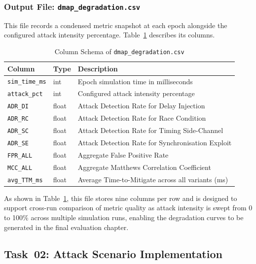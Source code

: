 \subsubsection{Output File: \texttt{dmap\_degradation.csv}}

This file records a condensed metric snapshot at each
epoch alongside the configured attack intensity
percentage. Table~\ref{tab:degradation_schema}
describes its columns.

\begin{table}[htb]
\centering
\caption{Column Schema of \texttt{dmap\_degradation.csv}}
\label{tab:degradation_schema}
\setlength{\tabcolsep}{4pt}
\begin{tabular}{lll}
\hline
\textbf{Column} & \textbf{Type} & \textbf{Description} \\
\hline
\texttt{sim\_time\_ms} & int   &
  Epoch simulation time in milliseconds \\
\texttt{attack\_pct}   & int   &
  Configured attack intensity percentage \\
\texttt{ADR\_DI}       & float &
  Attack Detection Rate for Delay Injection \\
\texttt{ADR\_RC}       & float &
  Attack Detection Rate for Race Condition \\
\texttt{ADR\_SC}       & float &
  Attack Detection Rate for Timing Side-Channel \\
\texttt{ADR\_SE}       & float &
  Attack Detection Rate for Synchronisation Exploit \\
\texttt{FPR\_ALL}      & float &
  Aggregate False Positive Rate \\
\texttt{MCC\_ALL}      & float &
  Aggregate Matthews Correlation Coefficient \\
\texttt{avg\_TTM\_ms}  & float &
  Average Time-to-Mitigate across all variants (ms) \\
\hline
\end{tabular}
\end{table}

As shown in Table~\ref{tab:degradation_schema}, this
file stores nine columns per row and is designed to
support cross-run comparison of metric quality as
attack intensity is swept from 0 to 100\% across
multiple simulation runs, enabling the degradation
curves to be generated in the final evaluation chapter.

\subsection{Task~02: Attack Scenario Implementation}

